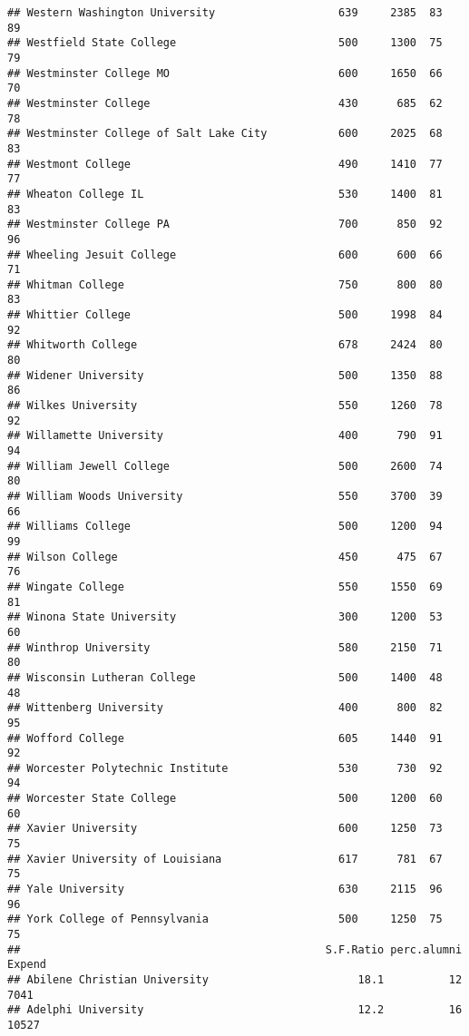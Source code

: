\documentclass[
]{article}
\begin{document}
\begin{verbatim}
## Western Washington University                   639     2385  83       89
## Westfield State College                         500     1300  75       79
## Westminster College MO                          600     1650  66       70
## Westminster College                             430      685  62       78
## Westminster College of Salt Lake City           600     2025  68       83
## Westmont College                                490     1410  77       77
## Wheaton College IL                              530     1400  81       83
## Westminster College PA                          700      850  92       96
## Wheeling Jesuit College                         600      600  66       71
## Whitman College                                 750      800  80       83
## Whittier College                                500     1998  84       92
## Whitworth College                               678     2424  80       80
## Widener University                              500     1350  88       86
## Wilkes University                               550     1260  78       92
## Willamette University                           400      790  91       94
## William Jewell College                          500     2600  74       80
## William Woods University                        550     3700  39       66
## Williams College                                500     1200  94       99
## Wilson College                                  450      475  67       76
## Wingate College                                 550     1550  69       81
## Winona State University                         300     1200  53       60
## Winthrop University                             580     2150  71       80
## Wisconsin Lutheran College                      500     1400  48       48
## Wittenberg University                           400      800  82       95
## Wofford College                                 605     1440  91       92
## Worcester Polytechnic Institute                 530      730  92       94
## Worcester State College                         500     1200  60       60
## Xavier University                               600     1250  73       75
## Xavier University of Louisiana                  617      781  67       75
## Yale University                                 630     2115  96       96
## York College of Pennsylvania                    500     1250  75       75
##                                               S.F.Ratio perc.alumni Expend
## Abilene Christian University                       18.1          12   7041
## Adelphi University                                 12.2          16  10527

\end{verbatim}
\end{document}

